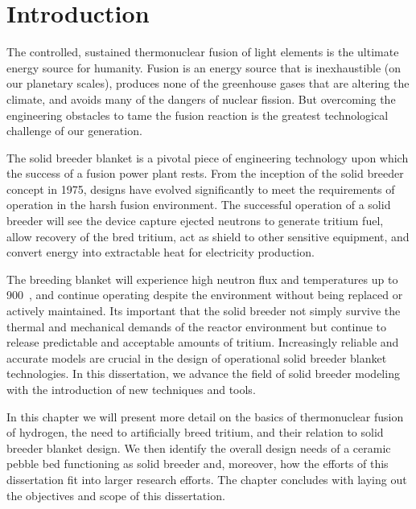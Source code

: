 \chapter{Introduction} \label{sec:introduction}
The controlled, sustained thermonuclear fusion of light elements is the ultimate energy source for humanity. Fusion is an energy source that is inexhaustible (on our planetary scales), produces none of the greenhouse gases that are altering the climate, and avoids many of the dangers of nuclear fission. But overcoming the engineering obstacles to tame the fusion reaction is the greatest technological challenge of our generation.

The solid breeder blanket is a pivotal piece of engineering technology upon which the success of a fusion power plant rests. From the inception of the solid breeder concept in 1975, designs have evolved significantly to meet the requirements of operation in the harsh fusion environment. The successful operation of a solid breeder will see the device capture ejected neutrons to generate tritium fuel, allow recovery of the bred tritium, act as shield to other sensitive equipment, and convert energy into extractable heat for electricity production.

The breeding blanket will experience high neutron flux and temperatures up to 900~\celsius, and continue operating despite the environment without being replaced or actively maintained. Its important that the solid breeder not simply survive the thermal and mechanical demands of the reactor environment but continue to release predictable and acceptable amounts of tritium. Increasingly reliable and accurate models are crucial in the design of operational solid breeder blanket technologies. In this dissertation, we advance the field of solid breeder modeling with the introduction of new techniques and tools.

In this chapter we will present more detail on the basics of thermonuclear fusion of hydrogen, the need to artificially breed tritium, and their relation to solid breeder blanket design. We then identify the overall design needs of a ceramic pebble bed functioning as solid breeder and, moreover, how the efforts of this dissertation fit into larger research efforts. The chapter concludes with laying out the objectives and scope of this dissertation.



%


